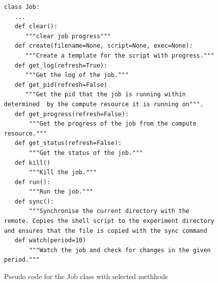 \begin{figure}[htb]
\caption{Pseudo code for the Job class with selected methhods}
\label{fig:code-job}
\begin{verbatim}
class Job:
   ...
   def clear():
      """clear job progress"""
   def create(filename=None, script=None, exec=None):
      """Create a template for the script with progress."""
   def get_log(refresh=True):
      """Get the log of the job."""
   def get_pid(refresh=False)
      """Get the pid that the job is running within determined  by the compute resource it is running on""".
   def get_progress(refresh=False):
       """Get the progress of the job from the compute resource."""
   def get_status(refresh=False):
       """Get the status of the job."""
   def kill()
       """Kill the job."""
   def run():
       """Run the job."""
   def sync():
       """Synchronise the current directory with the remote. Copies the shell script to the experiment directory and ensures that the file is copied with the sync command
   def watch(period=10)
       """Watch the job and check for changes in the given period."""

\end{verbatim}
\end{figure}

